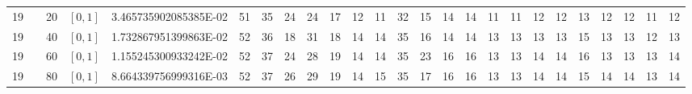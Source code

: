 \documentclass{article}
\begin{document}
\begin{landscape}
\begin{longtable}{ccccccccccccccccccccccccc}
  19 &  & 20         & $[0,1]$ & 3.465735902085385E-02 & \cellcolor{red!75} 51        &\cellcolor{red!5} 35        &\cellcolor{red!5} 24        &\cellcolor{red!5} 24        &17        &\cellcolor{green!5} 12        &\cellcolor{green!25} 11        &\cellcolor{red!5} 32        &\cellcolor{green!5} 15        &\cellcolor{green!5} 14        &\cellcolor{green!5} 14        &\cellcolor{green!25} 11        &\cellcolor{green!25} 11        &\cellcolor{green!5} 12        &\cellcolor{green!5} 12        &\cellcolor{green!5} 13        &\cellcolor{green!5} 12        &\cellcolor{green!5} 12        &\cellcolor{green!25} 11        &\cellcolor{green!5} 12\\
  19 &  & 40         & $[0,1]$ & 1.732867951399863E-02 & \cellcolor{red!75} 52        &\cellcolor{red!5} 36        &18        &\cellcolor{red!5} 31        &18        &\cellcolor{green!5} 14        &\cellcolor{green!5} 14        &\cellcolor{red!5} 35        &\cellcolor{green!5} 16        &\cellcolor{green!5} 14        &\cellcolor{green!5} 14        &\cellcolor{green!5} 13        &\cellcolor{green!5} 13        &\cellcolor{green!5} 13        &\cellcolor{green!5} 13        &\cellcolor{green!5} 15        &\cellcolor{green!5} 13        &\cellcolor{green!5} 13        &\cellcolor{green!75} 12        &\cellcolor{green!5} 13\\
  19 &  & 60         & $[0,1]$ & 1.155245300933242E-02 & \cellcolor{red!75} 52        &\cellcolor{red!5} 37        &24        &\cellcolor{red!5} 28        &19        &\cellcolor{green!5} 14        &\cellcolor{green!5} 14        &\cellcolor{red!5} 35        &23        &\cellcolor{green!5} 16        &\cellcolor{green!5} 16        &\cellcolor{green!25} 13        &\cellcolor{green!25} 13        &\cellcolor{green!5} 14        &\cellcolor{green!5} 14        &\cellcolor{green!5} 16        &\cellcolor{green!25} 13        &\cellcolor{green!25} 13        &\cellcolor{green!25} 13        &\cellcolor{green!5} 14\\
  19 &  & 80         & $[0,1]$ & 8.664339756999316E-03 & \cellcolor{red!75} 52        &\cellcolor{red!5} 37        &\cellcolor{red!5} 26        &\cellcolor{red!5} 29        &19        &\cellcolor{green!5} 14        &\cellcolor{green!5} 15        &\cellcolor{red!5} 35        &\cellcolor{green!5} 17        &\cellcolor{green!5} 16        &\cellcolor{green!5} 16        &\cellcolor{green!25} 13        &\cellcolor{green!25} 13        &\cellcolor{green!5} 14        &\cellcolor{green!5} 14        &\cellcolor{green!5} 15        &\cellcolor{green!5} 14        &\cellcolor{green!5} 14        &\cellcolor{green!25} 13        &\cellcolor{green!5} 14\\

\end{longtable}
\end{landscape}
\end{document}
